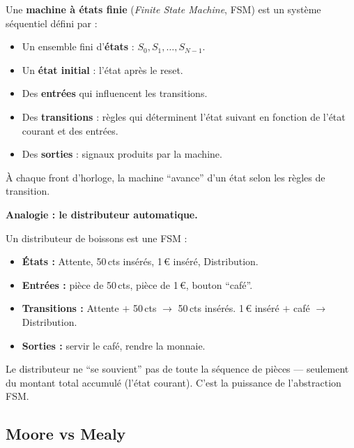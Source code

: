 \documentclass[12pt,a4paper,twoside]{book}
\begin{document}
\begin{formule}
Une \textbf{machine à états finie} (\textit{Finite State Machine}, FSM) est un système séquentiel défini par :
\begin{itemize}[nosep]
\item Un ensemble fini d'\textbf{états} : $S_0, S_1, \ldots, S_{N-1}$.
\item Un \textbf{état initial} : l'état après le reset.
\item Des \textbf{entrées} qui influencent les transitions.
\item Des \textbf{transitions} : règles qui déterminent l'état suivant en fonction de l'état courant et des entrées.
\item Des \textbf{sorties} : signaux produits par la machine.
\end{itemize}
À chaque front d'horloge, la machine ``avance'' d'un état selon les règles de transition.
\end{formule}

\begin{intuition}
\textbf{Analogie : le distributeur automatique.}

Un distributeur de boissons est une FSM :
\begin{itemize}[nosep]
\item \textbf{États :} Attente, 50\,cts insérés, 1\,€ inséré, Distribution.
\item \textbf{Entrées :} pièce de 50\,cts, pièce de 1\,€, bouton ``café''.
\item \textbf{Transitions :} Attente $+$ 50\,cts $\to$ 50\,cts insérés. 1\,€ inséré $+$ café $\to$ Distribution.
\item \textbf{Sorties :} servir le café, rendre la monnaie.
\end{itemize}
Le distributeur ne ``se souvient'' pas de toute la séquence de pièces --- seulement du montant total accumulé (l'état courant). C'est la puissance de l'abstraction FSM.
\end{intuition}

\subsection{Moore vs Mealy}
\end{document}
